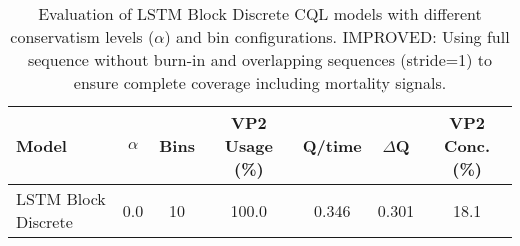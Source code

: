 \begin{table}[ht]
\centering
\caption{Evaluation of LSTM Block Discrete CQL models with different conservatism levels ($\alpha$) and bin configurations. IMPROVED: Using full sequence without burn-in and overlapping sequences (stride=1) to ensure complete coverage including mortality signals.}
\label{tab:lstm_cql_evaluation_improved}
\begin{tabular}{lcccccc}
\toprule
Model & $\alpha$ & Bins & VP2 Usage (\%) & Q/time & $\Delta$Q & VP2 Conc. (\%) \\
\midrule
LSTM Block Discrete & 0.0 & 10 & 100.0 & 0.346 & 0.301 & 18.1 \\
\bottomrule
\end{tabular}
\end{table}